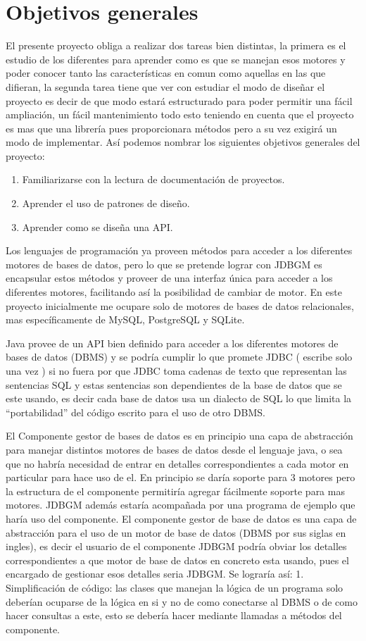 \section{Objetivos generales}
El presente proyecto obliga a realizar dos tareas bien distintas, la primera es el estudio de los diferentes \dd para aprender como es que se manejan esos motores y poder conocer tanto las características en comun como aquellas en las que difieran, la segunda tarea tiene que ver con estudiar el modo de diseñar el proyecto es decir de que modo estará estructurado \jj para poder permitir una fácil ampliación, un fácil mantenimiento todo esto teniendo en cuenta que el proyecto es mas que una librería pues proporcionara métodos pero a su vez exigirá un modo de implementar. Así podemos nombrar los siguientes objetivos generales del proyecto:
\begin{enumerate}
\item Familiarizarse con la lectura de documentación de proyectos.
\item Aprender el uso de patrones de diseño.
\item Aprender como se diseña una API.
\end{enumerate}
Los lenguajes de programación ya proveen métodos para acceder a los diferentes
motores de bases de datos, pero lo que se pretende lograr con JDBGM es encapsular estos
métodos y proveer de una interfaz única para acceder a los diferentes motores, facilitando
así la posibilidad de cambiar de motor. En este proyecto inicialmente me ocupare solo de
motores de bases de datos relacionales, mas específicamente de MySQL, PostgreSQL y
SQLite.


Java provee de un API bien definido para acceder a los diferentes motores de
bases de datos (DBMS) y se podría cumplir lo que promete JDBC ( escribe solo una
vez ) si no fuera por que JDBC toma cadenas de texto que representan las sentencias
SQL y estas sentencias son dependientes de la base de datos que se este usando, es
decir cada base de datos usa un dialecto de SQL lo que limita la “portabilidad” del
código escrito para el uso de otro DBMS.


El Componente gestor de bases de datos es en principio una capa de abstracción para manejar distintos motores de bases de datos desde el lenguaje java, o sea que no habría necesidad de entrar en detalles correspondientes a cada motor en particular para hace uso de el. En principio se daría soporte para 3 motores pero  la estructura de el componente permitiría agregar fácilmente soporte para mas motores. JDBGM además estaría acompañada por una programa de ejemplo que haría uso del componente.
 El componente gestor de base  de datos es una capa de abstracción para el uso de un motor de base de datos (DBMS por sus siglas en ingles), es decir el usuario de el componente JDBGM podría obviar los detalles correspondientes a que motor de base de datos en concreto esta usando, pues el encargado de gestionar esos detalles seria JDBGM. Se lograría así:
1. Simplificación de código: las clases que manejan la lógica de un programa solo deberían ocuparse de la lógica en si y no de como conectarse al DBMS o de como hacer consultas a este, esto se debería hacer mediante llamadas a métodos del componente.

